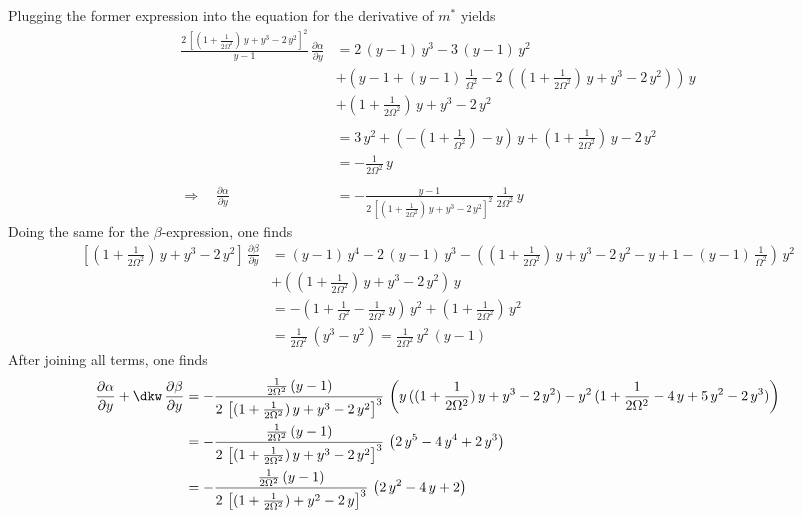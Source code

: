     Plugging the former expression into the equation for the derivative of $m^*$ yields
    \begin{align*}
        \frac{2\,\left[(1+\frac{1}{2\Omega^2})\,{y}+{y}^3-2\,{y}^2\right]^2}{{y}-1}\,\frac{\partial \alpha}{\partial{y}}&=2\,({y}-1)\,{y}^3-3\,({y}-1)\,{y}^2\\
        &+\left( {y}-1+({y}-1)\,\frac{1}{\Omega^2}-2\,\left((1+\frac{1}{2\Omega^2})\,{y}+{y}^3-2\,{y}^2\right) \right)\,{y}\\
        &+(1+\frac{1}{2\Omega^2})\,{y}+{y}^3-2\,{y}^2 \\\\
        &=3\,{y}^2+\left( -(1+\frac{1}{\Omega^2})-{y}\right)\,{y}+(1+\frac{1}{2\Omega^2})\,{y}-2\,{y}^2\\
        &=-\frac{1}{2\Omega^2}\,{y}\\\\
        \Rightarrow\quad\frac{\partial \alpha}{\partial{y}}&=-\frac{{y}-1}{2\,\left[(1+\frac{1}{2\Omega^2})\,{y}+{y}^3-2\,{y}^2\right]^2}\,\frac{1}{2\Omega^2}\,{y}
    \end{align*}
    Doing the same for the $\beta$-expression, one finds
    \begin{align*}
        \left[(1+\frac{1}{2\Omega^2})\,{y}+{y}^3-2\,{y}^2\right]\,\frac{\partial \beta}{\partial{y}}&=({y}-1)\,{y}^4-2\,({y}-1)\,{y}^3-\left( (1+\frac{1}{2\Omega^2})\,{y}+{y}^3-2\,{y}^2-{y}+1-({y}-1)\,\frac{1}{\Omega^2} \right)\,{y}^2\\
        &+((1+\frac{1}{2\Omega^2})\,{y}+{y}^3-2\,{y}^2)\,{y}\\
        &=-\left( 1+\frac{1}{\Omega^2}-\frac{1}{2\Omega^2}\,{y}  \right)\,{y}^2+(1+\frac{1}{2\Omega^2})\,{y}^2\\
        &=\frac{1}{2\Omega^2}\,({y}^3-{y}^2)=\frac{1}{2\Omega^2}\,{y}^2\,({y}-1)
    \end{align*}
    After joining all terms, one finds
    \begin{align*}
        \frac{\partial \alpha}{\partial{y}}+\dkw\,\frac{\partial \beta}{\partial{y}}&=-\frac{\frac{1}{2\Omega^2}\,({y}-1)}{2\,\left[(1+\frac{1}{2\Omega^2})\,{y}+{y}^3-2\,{y}^2\right]^3}\,\left( {y}\,((1+\frac{1}{2\Omega^2})\,{y}+{y}^3-2\,{y}^2) -{y}^2\,(1+\frac{1}{2\Omega^2}-4\,{y}+5\,{y}^2-2\,{y}^3)\right)\\
        &=-\frac{\frac{1}{2\Omega^2}\,({y}-1)}{2\,\left[(1+\frac{1}{2\Omega^2})\,{y}+{y}^3-2\,{y}^2\right]^3}\,\left( 2\,{y}^5-4\,{y}^4+2\,{y}^3 \right)\\
        &=-\frac{\frac{1}{2\Omega^2}\,({y}-1)}{2\,\left[(1+\frac{1}{2\Omega^2})+{y}^2-2\,{y}\right]^3}\,\left( 2\,{y}^2-4\,{y}+2 \right)
    \end{align*}
